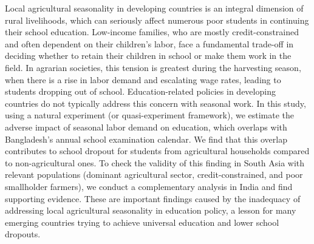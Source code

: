 \documentclass[12pt,letterpaper]{article}
\newcommand{\0}{\ensuremath{\mbox{\boldmath $0$}}}
\begin{document}
Local agricultural seasonality in developing countries is an integral dimension of rural livelihoods, which can seriously affect numerous poor students in continuing their school education. Low-income families, who are mostly credit-constrained and often dependent on their children’s labor, face a fundamental trade-off in deciding whether to retain their children in school or make them work in the field. In agrarian societies, this tension is greatest during the harvesting season, when there is a rise in labor demand and escalating wage rates, leading to students dropping out of school. Education-related policies in developing countries do not typically address this concern with seasonal work. In this study, using a natural experiment (or quasi-experiment framework), we estimate the adverse impact of seasonal labor demand on education, which overlaps with Bangladesh’s annual school examination calendar. We find that this overlap contributes to school dropout for students from agricultural households compared to non-agricultural ones. To check the validity of this finding in South Asia with relevant populations (dominant agricultural sector, credit-constrained, and poor smallholder farmers), we conduct a complementary analysis in India and find supporting evidence. These are important findings caused by the inadequacy of addressing local agricultural seasonality in education policy, a lesson for many emerging countries trying to achieve universal education and lower school dropouts.

\end{document}
